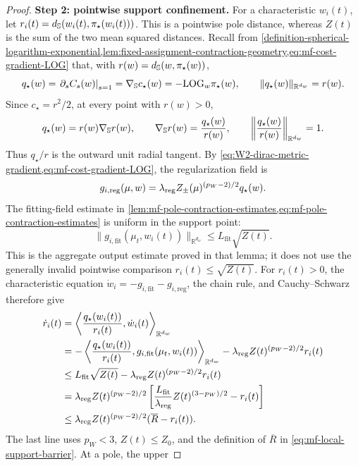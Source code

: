 \begin{proof}
\par\noindent\textbf{Step 2: pointwise support confinement.}
For a characteristic \(w_i(t)\), let
\(r_i(t)=d_{\mathbb{S}}(w_i(t),\pi_\star(w_i(t)))\). This is a pointwise pole
distance, whereas \(Z(t)\) is the sum of the two mean squared distances.
Recall from
\cref{definition-spherical-logarithm-exponential,lem:fixed-assignment-contraction-geometry,eq:mf-cost-gradient-LOG}
that, with \(r(w)=d_{\mathbb{S}}(w,\pi_\star(w))\),
\[
 q_\star(w)
 =\left.\partial_sC_s(w)\right|_{s=1}
 =\nabla_{\mathbb{S}} c_\star(w)
 =-\mathrm{LOG}_w\pi_\star(w),
 \qquad
 \|q_\star(w)\|_{\mathbb R^{d_w}}=r(w).
\]
Since \(c_\star=r^2/2\), at every point with \(r(w)>0\),
\[
 q_\star(w)=r(w)\nabla_{\mathbb{S}} r(w),
 \qquad
 \nabla_{\mathbb{S}} r(w)=\frac{q_\star(w)}{r(w)},
 \qquad
 \left\|\frac{q_\star(w)}{r(w)}\right\|_{\mathbb R^{d_w}}=1.
\]
Thus \(q_\star/r\) is the outward unit radial tangent. By
\cref{eq:W2-dirac-metric-gradient,eq:mf-cost-gradient-LOG}, the
regularization field is
\[
 g_{i,\mathrm{reg}}(\mu,w)
 =\lambda_{\mathrm{reg}} Z_\pm(\mu)^{(p_W-2)/2}q_\star(w).
\]
The fitting-field estimate in
\cref{lem:mf-pole-contraction-estimates,eq:mf-pole-contraction-estimates}
is uniform in the support point:
\[
 \|g_{i,\mathrm{fit}}(\mu_t,w_i(t))\|_{\mathbb R^{d_w}}
 \le L_{\mathrm{fit}}\sqrt{Z(t)}.
\]
This is the aggregate output estimate proved in that lemma; it does not use
the generally invalid pointwise comparison \(r_i(t)\le\sqrt{Z(t)}\).
For \(r_i(t)>0\), the characteristic equation
\(\dot w_i=-g_{i,\mathrm{fit}}-g_{i,\mathrm{reg}}\), the chain rule, and
Cauchy--Schwarz therefore give
\begin{align}
 \dot r_i(t)
 &=\left\langle\frac{q_\star(w_i(t))}{r_i(t)},\dot w_i(t)
          \right\rangle_{\mathbb R^{d_w}}\notag\\
 &=-\left\langle\frac{q_\star(w_i(t))}{r_i(t)},
                 g_{i,\mathrm{fit}}(\mu_t,w_i(t))
          \right\rangle_{\mathbb R^{d_w}}
       -\lambda_{\mathrm{reg}} Z(t)^{(p_W-2)/2}r_i(t)\notag\\
 &\le L_{\mathrm{fit}}\sqrt{Z(t)}
       -\lambda_{\mathrm{reg}} Z(t)^{(p_W-2)/2}r_i(t)\notag\\
 &=\lambda_{\mathrm{reg}} Z(t)^{(p_W-2)/2}
       \left[\frac{L_{\mathrm{fit}}}{\lambda_{\mathrm{reg}}}
                    Z(t)^{(3-p_W)/2}-r_i(t)\right]\notag\\
 &\le\lambda_{\mathrm{reg}} Z(t)^{(p_W-2)/2}(\overline R-r_i(t)).
 \label{eq:mf-pointwise-radius-differential}
\end{align}
The last line uses \(p_W<3\), \(Z(t)\le Z_0\), and the definition of
\(\overline R\) in \cref{eq:mf-local-support-barrier}. At a pole, the upper

\end{proof}

